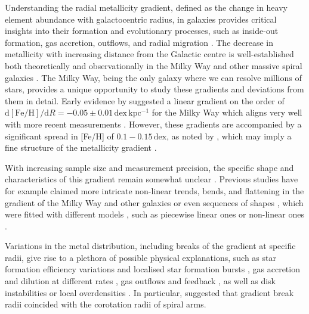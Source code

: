 \documentclass[twocolumn,apj,numberedappendix,appendixfloats,twocolappendix]{openjournal}
\begin{document}
\begin{CJK*}{UTF8}{gbsn}
Understanding the radial metallicity gradient, defined as the change in heavy element abundance with galactocentric radius, in galaxies provides critical insights into their formation and evolutionary processes, such as inside-out formation, gas accretion, outflows, and radial migration \citep[e.g.][]{Quirk1973, Tinsley1980, Lacey1985, Wyse1989, Kauffman1996, Chiappini1997, Schoenrich2009b, Moran2012, Bird2013}. The decrease in metallicity with increasing distance from the Galactic centre is well-established both theoretically \citep{Larson1976, Tinsley1980, Chiosi1980} and observationally in the Milky Way \citep{Searle1971, Janes1979, Twarog1997} and other massive spiral galaxies \citep[e.g.][]{Tinsley1980, Zaritsky1994,Bresolin2012}. The Milky Way, being the only galaxy where we can resolve millions of stars, provides a unique opportunity to study these gradients and deviations from them in detail. Early evidence by \citet{Janes1979} suggested a linear gradient on the order of $\mathrm{d{[Fe/H]}} / \mathrm{d}R = -0.05 \pm 0.01\,\mathrm{dex\,kpc^{-1}}$ for the Milky Way which aligns very well with more recent measurements \citep{Anders2017, Hayden2015}. However, these gradients are accompanied by a significant spread in [Fe/H] of $0.1-0.15\,\mathrm{dex}$, as noted by \citet{Twarog1980}, which may imply a fine structure of the metallicity gradient \citep[see][]{Genovali2014}.

With increasing sample size and measurement precision, the specific shape and characteristics of this gradient remain somewhat unclear \citep{Chiappini2002}. Previous studies have for example claimed more intricate non-linear trends, bends, and flattening in the gradient of the Milky Way \citep[e.g.][]{Donor2020} and other galaxies \citep[e.g.][]{Pilyugin2003, Sanchez2014} or even sequences of shapes \citep{Pilyugin2017, Pilyugin2024}, which were fitted with different models \citep{RosalesOrtega2011, Bresolin2012}, such as piecewise linear ones \citep[e.g.][]{SanchezMenguiano2016} or non-linear ones \citep[e.g.][]{Scarano2013}.

Variations in the metal distribution, including breaks of the gradient at specific radii, give rise to a plethora of possible physical explanations, such as star formation efficiency variations and localised star formation bursts \citep{Sanchez2014, SanchezBlazquez2014, Ho2015}, gas accretion and dilution at different rates \citep{Bresolin2012, Sanchez2013, Belfiore2016, SanchezMenguiano2016}, gas outflows and feedback \citep{Lilly2013, Ma2017b}, as well as disk instabilities or local overdensities \citep{Grand2016, Ho2017c}. In particular, \citet{Scarano2013} suggested that gradient break radii coincided with the corotation radii of spiral arms.


\end{CJK*}
\end{document}
